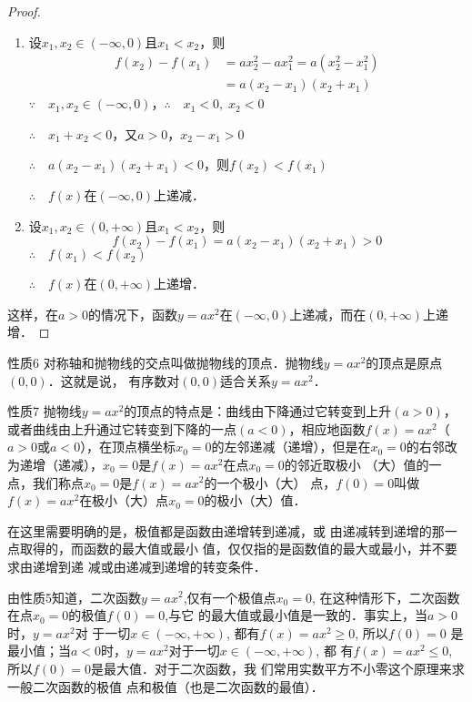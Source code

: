 \begin{proof}
\begin{enumerate}
    \item 设$x_1,x_2\in(-\infty,0)$且$x_1<x_2$，则
    \[\begin{split}
        f(x_2)-f(x_1)&=ax^2_2-ax^2_1=a(x^2_2-x^2_1)\\
&=a(x_2-x_1)(x_2+x_1)
    \end{split}\]
$\because \quad x_1,x_2\in(-\infty,0)$，$\therefore\quad x_1<0,\; x_2<0$

$\therefore\quad x_1+x_2<0$，又$a>0$，$x_2-x_1>0$

$\therefore\quad a(x_2-x_1)(x_2+x_1)<0$，则$f(x_2)<f(x_1)$

$\therefore\quad f(x)$在$(-\infty,0)$上递减．

    \item 设$x_1,x_2\in(0,+\infty)$且$x_1<x_2$，则
    \[f(x_2)-f(x_1)=a(x_2-x_1)(x_2+x_1)>0\]
    $\therefore\quad f(x_1)<f(x_2)$

$\therefore\quad f(x)$在$(0,+\infty)$上递增．
\end{enumerate} 

这样，在$a>0$的情况下，函数$y=ax^2$在$(-\infty,0)$上递减，而在$(0,+\infty)$上递增．
\end{proof}

\begin{blk}{性质6}
对称轴和抛物线的交点叫做抛物线的顶点．抛物线$y=ax^2$的顶点是原点$(0,0)$．这就是说，
有序数对$(0,0)$适合关系$y=ax^2$．
\end{blk}

\begin{blk}{性质7}
    抛物线$y=ax^2$的顶点的特点是：曲线由下降通过它转变到上升$(a>0)$，或者曲线由上升通过它转变到下降的一点$(a<0)$，相应地函数$f(x)=ax^2$（$a>0$或$a<0$），在顶点横坐标$x_0=0$的左邻递减（递增），但是在$x_0=0$的右邻改为递增（递减），$x_0=0$是$f(x)=ax^2$在点$x_0=0$的邻近取极小
    （大）值的一点，我们称点$x_0=0$是$f(x)=ax^2$的一个极小（大）
    点，$f(0)=0$叫做$f(x)=ax^2$在极小（大）点$x_0=0$的极小（大）值．
\end{blk}



    在这里需要明确的是，极值都是函数由递增转到递减，或
    由递减转到递增的那一点取得的，而函数的最大值或最小
    值，仅仅指的是函数值的最大或最小，并不要求由递增到递
    减或由递减到递增的转变条件．

    由性质5知道，二次函数$y=ax^2$,仅有一个极值点$x_0=0$,
    在这种情形下，二次函数在点$x_0=0$的极值$f(0)=0$,与它
    的最大值或最小值是一致的．事实上，当$a>0$时，$y=ax^2$对
    于一切$x\in(-\infty,+\infty)$, 都有$f(x)=ax^2\ge 0$, 所以$f(0)=0$
    是最小值；当$a<0$时，$y=ax^2$对于一切$x\in(-\infty,+\infty)$, 都
    有$f(x)=ax^2\le 0$, 所以$f(0)=0$是最大值．对于二次函数，我
    们常用实数平方不小零这个原理来求一般二次函数的极值
    点和极值（也是二次函数的最值）．

